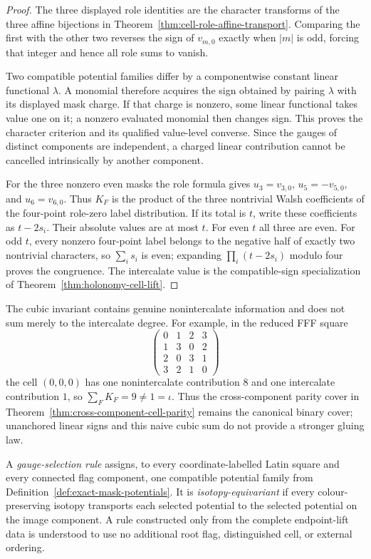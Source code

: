 \begin{proof}
The three displayed role identities are the character transforms of the
three affine bijections in Theorem~\ref{thm:cell-role-affine-transport}.
Comparing the first with the other two reverses the sign of $v_{m,0}$ exactly
when $|m|$ is odd, forcing that integer and hence all role sums to vanish.

Two compatible potential families differ by a componentwise constant linear
functional $\lambda$.  A monomial therefore acquires the sign obtained by
pairing $\lambda$ with its displayed mask charge.  If that charge is nonzero,
some linear functional takes value one on it; a nonzero evaluated monomial
then changes sign.  This proves the character criterion and its qualified
value-level converse.  Since the gauges of distinct components are independent, a
charged linear contribution cannot be cancelled intrinsically by another
component.

For the three nonzero even masks the role formula gives
$u_3=v_{3,0}$, $u_5=-v_{5,0}$, and $u_6=v_{6,0}$.  Thus $K_F$ is the product
of the three nontrivial Walsh coefficients of the four-point role-zero label
distribution.  If its total is $t$, write these coefficients as $t-2s_i$.
Their absolute values are at most $t$.  For even $t$ all three are even.  For
odd $t$, every nonzero four-point label belongs to the negative half of
exactly two nontrivial characters, so $\sum_i s_i$ is even; expanding
$\prod_i(t-2s_i)$ modulo four proves the congruence.  The intercalate value is
the compatible-sign specialization of Theorem~\ref{thm:holonomy-cell-lift}.
\end{proof}

The cubic invariant contains genuine nonintercalate information and does not
sum merely to the intercalate degree.  For example, in the reduced FFF square
\[
\begin{pmatrix}
0&1&2&3\\1&3&0&2\\2&0&3&1\\3&2&1&0
\end{pmatrix}
\]
the cell $(0,0,0)$ has one nonintercalate contribution $8$ and one
intercalate contribution $1$, so $\sum_FK_F=9\ne1=\iota$.  Thus the
cross-component parity cover in
Theorem~\ref{thm:cross-component-cell-parity} remains
the canonical binary cover; unanchored linear signs and this naive cubic sum
do not provide a stronger gluing law.

\begin{definition}
A \emph{gauge-selection rule} assigns, to every coordinate-labelled Latin
square and every connected flag component, one compatible potential family
from Definition~\ref{def:exact-mask-potentials}.  It is
\emph{isotopy-equivariant} if every colour-preserving isotopy transports each
selected potential to the selected potential on the image component.  A rule
constructed only from the complete endpoint-lift data is understood to use no
additional root flag, distinguished cell, or external ordering.
\end{definition}

